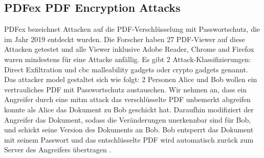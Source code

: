 \subsection{PDFex PDF Encryption Attacks}
PDFex bezeichnet Attacken auf die PDF-Verschlüsselung mit Passwortschutz, die im Jahr 2019 entdeckt wurden. Die Forscher haben 27 PDF-Viewer auf diese Attacken getestet und alle Viewer inklusive Adobe Reader, Chrome and Firefox waren mindestens für eine Attacke anfällig. Es gibt 2 Attack-Klassifizierungen: Direct Exfiltration und \gls{cbc} malleability gadgets oder crypto gadgets genannt.
Das attacker model gestaltet sich wie folgt: 2 Personen Alice und Bob wollen ein vertrauliches PDF mit Passwortschutz austauschen. Wir nehmen an, dass ein Angreifer durch eine \gls{mitm} attack das verschlüsselte PDF unbemerkt abgreifen konnte als Alice das Dokument zu Bob geschickt hat. Daraufhin modifiziert der Angreifer das Dokument, sodass die Veränderungen unerkennbar sind für Bob, und schickt seine Version des Dokuments an Bob. Bob entsperrt das Dokument mit seinem Passwort und das entschlüsselte PDF wird automatisch zurück zum Server des Angreifers übertragen \cite{ccc-break-pdf, pdfex}.
\par


